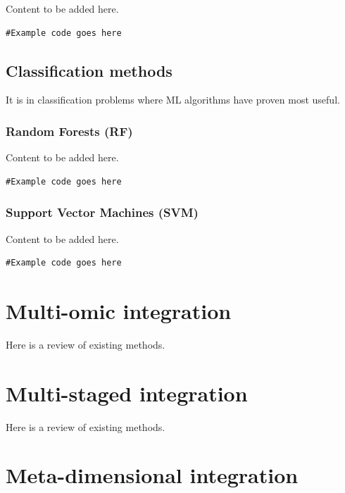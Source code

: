 \documentclass[
]{book}
\begin{document}
Content to be added here.

\begin{verbatim}
#Example code goes here
\end{verbatim}

\hypertarget{classification-methods}{%
\section{Classification methods}\label{classification-methods}}

It is in classification problems where ML algorithms have proven most useful.

\hypertarget{random-forests}{%
\subsection{Random Forests (RF)}\label{random-forests}}

Content to be added here.

\begin{verbatim}
#Example code goes here
\end{verbatim}

\hypertarget{support-vector-machines}{%
\subsection{Support Vector Machines (SVM)}\label{support-vector-machines}}

Content to be added here.

\begin{verbatim}
#Example code goes here
\end{verbatim}

\hypertarget{multi-omic-integration}{%
\chapter{Multi-omic integration}\label{multi-omic-integration}}

Here is a review of existing methods.

\hypertarget{multi-staged-integration}{%
\chapter{Multi-staged integration}\label{multi-staged-integration}}

Here is a review of existing methods.

\hypertarget{meta-dimensional-integration}{%
\chapter{Meta-dimensional integration}\label{meta-dimensional-integration}}
\end{document}
